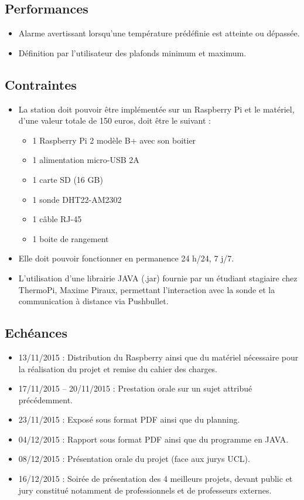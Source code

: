 \documentclass[10pt]{article}
\begin{document}
\subsection{Performances}
\begin{itemize}
\item Alarme avertissant lorsqu’une température prédéfinie est atteinte ou dépassée.
\item Définition par l’utilisateur des plafonds minimum et maximum.
\end{itemize}

\subsection{Contraintes}
\begin{itemize}
\item La station doit pouvoir être implémentée sur un Raspberry Pi et le matériel, d’une valeur totale de 150 euros, doit être le suivant :
\begin{itemize}
\item 1 Raspberry Pi 2 modèle B+ avec son boitier
\item 1 alimentation micro-USB 2A
\item 1 carte SD (16 GB)
\item 1 sonde DHT22-AM2302
\item 1 câble RJ-45
\item 1 boite de rangement
\end{itemize}
\item Elle doit pouvoir fonctionner en permanence 24 h/24, 7 j/7.
\item L’utilisation d’une librairie JAVA (.jar) fournie par un étudiant stagiaire chez ThermoPi, Maxime Piraux, permettant l’interaction avec la sonde et la communication à distance via Pushbullet.
\end{itemize}

\subsection{Echéances}
\begin{itemize}
\item 13/11/2015 : Distribution du Raspberry ainsi que du matériel nécessaire pour la réalisation du projet et remise du cahier des charges.
\item 17/11/2015 – 20/11/2015 : Prestation orale sur un sujet attribué précédemment.
\item 23/11/2015 : Exposé sous format PDF ainsi que du planning.
\item 04/12/2015 : Rapport sous format PDF ainsi que du programme en JAVA.
\item 08/12/2015 : Présentation orale du projet (face aux jurys UCL).
\item 16/12/2015 : Soirée de présentation des 4 meilleurs projets, devant public et jury constitué notamment de professionnels et de professeurs externes.
\end{itemize}
\end{document}
